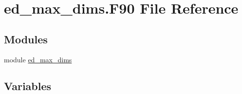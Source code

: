 \hypertarget{ed__max__dims_8_f90}{}\section{ed\+\_\+max\+\_\+dims.\+F90 File Reference}
\label{ed__max__dims_8_f90}
\subsection*{Modules}
\begin{DoxyCompactItemize}
\item 
module \hyperlink{namespaceed__max__dims}{ed\+\_\+max\+\_\+dims}
\end{DoxyCompactItemize}
\subsection*{Variables}
